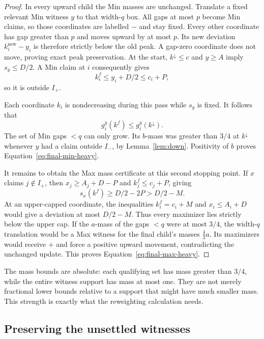 \begin{proof}
In every upward child the Min masses are unchanged. Translate a fixed
relevant Min witness $y$ to that width-$q$ box. All gaps at most
$p$ become Min claims, so those coordinates are labelled $-$ and
stay fixed. Every other coordinate has gap greater than $p$ and
moves upward by at most $p$. Its new deviation $k_i^{\mathrm{new}}-y_i$
is therefore strictly below the old peak. A gap-zero coordinate does
not move, proving exact peak preservation. At the start,
$k^{\downarrow}\le c$ and $y\ge A$ imply $s_y\le D/2$.
A Min claim at $i$ consequently gives
\[
                    k_i^f\le y_i+D/2\le c_i+P,
\]
so it is outside $I_+$.

Each coordinate $k_i$ is nondecreasing during this pass while $s_y$
is fixed. It follows that
\begin{equation}
                  g_i^y(k^f)\le g_i^y(k^{\downarrow}).
 \label{eq:min-gap-persistence}
\end{equation}
The set of Min gaps $<q$ can only grow. Its $b$-mass was greater
than $3/4$ at $k^{\downarrow}$ whenever $y$ had a claim outside
$I_-$, by Lemma~\ref{lem:down}. Positivity of $b$ proves
Equation~\eqref{eq:final-min-heavy}.

It remains to obtain the Max mass certificate at this second stopping
point. If $x$ claims $j\notin I_+$, then
$x_j\ge A_j+D-P$ and $k_j^f\le c_j+P$, giving
\[
                      s_x(k^f)\ge D/2-2P>D/2-M.
\]
At an upper-capped coordinate, the inequalities
$k_i^f=c_i+M$ and $x_i\le A_i+D$ would give a deviation at
most $D/2-M$. Thus every maximizer lies strictly below the upper
cap. If the $a$-mass of the gaps $<q$ were at most $3/4$, the
width-$q$ translation would be a Max witness for the final child's
masses $\frac43 a$. Its maximizers would receive $+$ and force a
positive upward movement, contradicting the unchanged update.
This proves Equation~\eqref{eq:final-max-heavy}.
\end{proof}

The mass bounds are absolute: each qualifying set has mass greater
than $3/4$, while the entire witness support has mass at most one.
They are not merely fractional lower bounds relative to a support
that might have much smaller mass. This strength is exactly what
the reweighting calculation needs.

\subsection{Preserving the unsettled witnesses}


